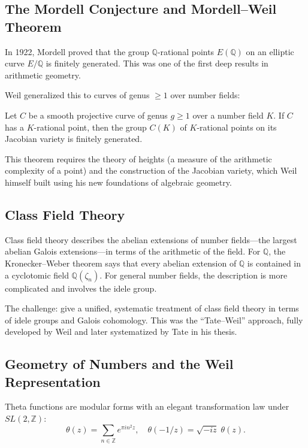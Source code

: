 \subsection{The Mordell Conjecture and Mordell--Weil Theorem}

In 1922, Mordell proved that the group $\mathbb{Q}$-rational points $E(\mathbb{Q})$ on an elliptic curve $E/\mathbb{Q}$ is finitely generated. This was one of the first deep results in arithmetic geometry.

Weil generalized this to curves of genus $\geq 1$ over number fields:
\begin{theorem}
Let $C$ be a smooth projective curve of genus $g \geq 1$ over a number field $K$. If $C$ has a $K$-rational point, then the group $C(K)$ of $K$-rational points on its Jacobian variety is finitely generated.
\end{theorem}

This theorem requires the theory of heights (a measure of the arithmetic complexity of a point) and the construction of the Jacobian variety, which Weil himself built using his new foundations of algebraic geometry.

\subsection{Class Field Theory}

Class field theory describes the abelian extensions of number fields---the largest abelian Galois extensions---in terms of the arithmetic of the field. For $\mathbb{Q}$, the Kronecker--Weber theorem says that every abelian extension of $\mathbb{Q}$ is contained in a cyclotomic field $\mathbb{Q}(\zeta_n)$. For general number fields, the description is more complicated and involves the idele group.

The challenge: give a unified, systematic treatment of class field theory in terms of idele groups and Galois cohomology. This was the ``Tate--Weil'' approach, fully developed by Weil and later systematized by Tate in his thesis.

\subsection{Geometry of Numbers and the Weil Representation}

Theta functions are modular forms with an elegant transformation law under $SL(2,\mathbb{Z})$:
\[
\theta(z) = \sum_{n \in \mathbb{Z}} e^{\pi i n^2 z}, \quad \theta(-1/z) = \sqrt{-iz} \; \theta(z).
\]

